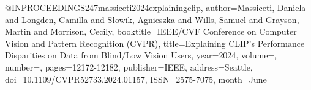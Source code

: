 @INPROCEEDINGS{247massiceti2024explainingclip,
author={Massiceti, Daniela and Longden, Camilla and Słowik, Agnieszka and Wills, Samuel and Grayson, Martin and Morrison, Cecily},
booktitle={IEEE/CVF Conference on Computer Vision and Pattern Recognition (CVPR)}, 
title={Explaining CLIP's Performance Disparities on Data from Blind/Low Vision Users}, 
year={2024},
volume={},
number={},
pages={12172-12182},
publisher={IEEE},
address={Seattle},
doi={10.1109/CVPR52733.2024.01157},
ISSN={2575-7075},
month={June}
}